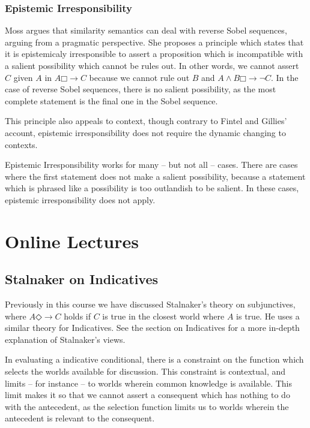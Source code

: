 \documentclass[12pt]{report}
\newcommand{\would}{{\mathbin{\Box}{\rightarrow}}}
\newcommand{\might}{{\mathbin{\Diamond}{\rightarrow}}}
\begin{document}
\section{Epistemic Irresponsibility}

Moss argues that similarity semantics can deal with reverse Sobel sequences,
arguing from a pragmatic perspective. She proposes a principle which states that
it is epistemicaly irresponsible to assert a proposition which is incompatible
with a salient possibility which cannot be rules out. In other words, we cannot
assert $C$ given $A$ in $A \would C$ because we cannot rule out $B$ and $A \land
B \would \lnot C$. In the case of reverse Sobel sequences, there is no salient
possibility, as the most complete statement is the final one in the Sobel
sequence.

This principle also appeals to context, though contrary to Fintel and Gillies'
account, epistemic irresponsibility does not require the dynamic changing to
contexts.

Epistemic Irresponsibility works for many -- but not all -- cases. There are
cases where the first statement does not make a salient possibility, because a
statement which is phrased like a possibility is too outlandish to be salient.
In these cases, epistemic irresponsibility does not apply.

\part{Online Lectures}
\chapter{Stalnaker on Indicatives}

Previously in this course we have discussed Stalnaker's theory on subjunctives,
where $A \might C$ holds if $C$ is true in the closest world where $A$ is true.
He uses a similar theory for Indicatives. See the section on Indicatives for a
more in-depth explanation of Stalnaker's views.

In evaluating a indicative conditional, there is a constraint on the function
which selects the worlds available for discussion. This constraint is
contextual, and limits -- for instance -- to worlds wherein common knowledge is
available. This limit makes it so that we cannot assert a consequent which has
nothing to do with the antecedent, as the selection function limits us to worlds
wherein the antecedent is relevant to the consequent.
\end{document}
